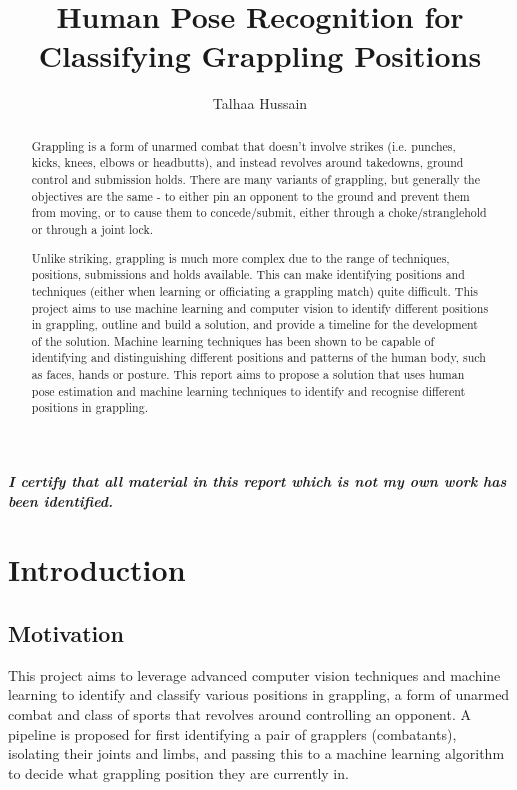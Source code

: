 \documentclass[a4paper, oneside, 11pt]{article}
\title{Human Pose Recognition for Classifying Grappling Positions}
\author{Talhaa Hussain}
\date{}
\begin{document}

\maketitle

\begin{abstract}
    Grappling is a form of unarmed combat that doesn't involve strikes (i.e. punches, kicks, knees, elbows or headbutts), and instead revolves around takedowns, ground control and submission holds. There are many variants of grappling, but generally the objectives are the same - to either pin an opponent to the ground and prevent them from moving, or to cause them to concede/submit, either through a choke/stranglehold or through a joint lock.

    Unlike striking, grappling is much more complex due to the range of techniques, positions, submissions and holds available. This can make identifying positions and techniques (either when learning or officiating a grappling match) quite difficult. This project aims to use machine learning and computer vision to identify different positions in grappling, outline and build a solution, and provide a timeline for the development of the solution. Machine learning techniques has been shown to be capable of identifying and distinguishing different positions and patterns of the human body, such as faces, hands or posture. This report aims to propose a solution that uses human pose estimation and machine learning techniques to identify and recognise different positions in grappling.  
\end{abstract}

\vspace*{\fill}
\textit{\textbf{I certify that all material in this report which is not my own work has been identified.}}
\newpage

\tableofcontents

\newpage
{}

\section{Introduction}

\subsection{Motivation}

This project aims to leverage advanced computer vision techniques and machine learning to identify and classify various positions in grappling, a form of unarmed combat and class of sports that revolves around controlling an opponent. A pipeline is proposed for first identifying a pair of grapplers (combatants), isolating their joints and limbs, and passing this to a machine learning algorithm to decide what grappling position they are currently in. 
\end{document}
